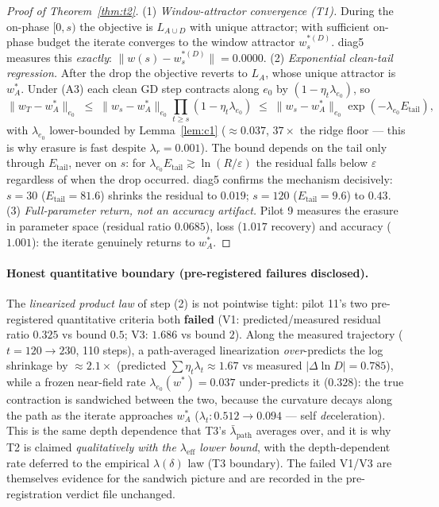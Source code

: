 \documentclass{article}
\newcommand{\lam}{\lambda}
\newcommand{\lameff}{\lam_{\mathrm{eff}}}
\newcommand{\lampath}{\bar{\lam}_{\mathrm{path}}}
\begin{document}
\begin{proof}[Proof of Theorem~\ref{thm:t2}]
(1) \emph{Window-attractor convergence (T1).} During the on-phase $[0,s)$ the objective is
$L_{A\cup D}$ with unique attractor; with sufficient on-phase budget the iterate converges to
the window attractor $w^{*(D)}_s$. diag5 measures this \emph{exactly}:
$\|w(s)-w^{*(D)}_s\|=0.0000$.
(2) \emph{Exponential clean-tail regression.} After the drop the objective reverts to $L_A$,
whose unique attractor is $w^*_A$. Under (A3) each clean GD step contracts along $e_0$ by
$(1-\eta_t\lam_{e_0})$, so
\begin{equation}
\|w_T-w^*_A\|_{e_0}\;\le\;\|w_s-w^*_A\|_{e_0}\prod_{t\ge s}(1-\eta_t\lam_{e_0})
\;\le\;\|w_s-w^*_A\|_{e_0}\exp(-\lam_{e_0}E_{\mathrm{tail}}),
\end{equation}
with $\lam_{e_0}$ lower-bounded by Lemma~\ref{lem:c1} ($\approx0.037$, $37\times$ the ridge
floor --- this is why erasure is fast despite $\lambda_r=0.001$). The bound depends on the
tail only through $E_{\mathrm{tail}}$, never on $s$: for
$\lam_{e_0}E_{\mathrm{tail}}\gtrsim\ln(R/\varepsilon)$ the residual falls below $\varepsilon$
regardless of when the drop occurred. diag5 confirms the mechanism decisively: $s{=}30$
($E_{\mathrm{tail}}=81.6$) shrinks the residual to $0.019$; $s{=}120$ ($E_{\mathrm{tail}}=9.6$)
to $0.43$.
(3) \emph{Full-parameter return, not an accuracy artifact.} Pilot 9 measures the erasure in
parameter space (residual ratio $0.0685$), loss ($1.017$ recovery) and accuracy ($1.001$):
the iterate genuinely returns to $w^*_A$.
\end{proof}

\paragraph{Honest quantitative boundary (pre-registered failures disclosed).}
The \emph{linearized product law} of step (2) is not pointwise tight: pilot 11's two
pre-registered quantitative criteria both \textbf{failed} (V1: predicted/measured residual
ratio $0.325$ vs bound $0.5$; V3: $1.686$ vs bound $2$). Along the measured trajectory
($t=120{\to}230$, 110 steps), a path-averaged linearization \emph{over}-predicts the log
shrinkage by $\approx2.1\times$ (predicted $\sum\eta_t\lambda_t\approx1.67$ vs measured
$|\Delta\ln D|=0.785$), while a frozen near-field rate $\lam_{e_0}(w^*)=0.037$ under-predicts
it ($0.328$): the true contraction is sandwiched between the two, because the curvature decays
along the path as the iterate approaches $w^*_A$ ($\lambda_t: 0.512\to0.094$ --- self
\emph{de}celeration). This is the same depth dependence that T3's $\lampath$ averages over,
and it is why T2 is claimed \emph{qualitatively with the $\lameff$ lower bound}, with the
depth-dependent rate deferred to the empirical $\lambda(\delta)$ law (T3 boundary). The
failed V1/V3 are themselves evidence for the sandwich picture and are recorded in the
pre-registration verdict file unchanged.
\end{document}
